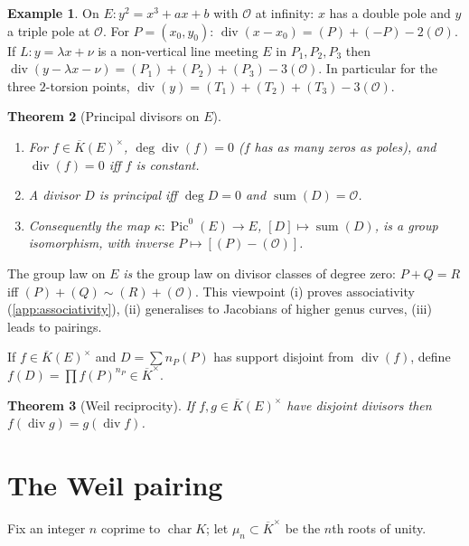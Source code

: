 \documentclass[11pt,a4paper,oneside]{book}
\theoremstyle{plain}
\newtheorem{theorem}{Theorem}[chapter]
\theoremstyle{definition}
\newtheorem{example}[theorem]{Example}
\theoremstyle{remark}
\newcommand{\Oinf}{\mathcal{O}}
\newcommand{\Kbar}{\overline{K}}
\newcommand{\Pic}{\operatorname{Pic}}
\newcommand{\divv}{\operatorname{div}}
\begin{document}
\begin{example}\label{ex:divisors}
On $E:y^2=x^3+ax+b$ with $\Oinf$ at infinity: $x$ has a double pole and $y$ a triple pole at $\Oinf$. For $P=(x_0,y_0)$: $\divv(x-x_0)=(P)+(-P)-2(\Oinf)$. If $L:y=\lambda x+\nu$ is a non-vertical line meeting $E$ in $P_1,P_2,P_3$ then $\divv(y-\lambda x-\nu)=(P_1)+(P_2)+(P_3)-3(\Oinf)$. In particular for the three $2$-torsion points, $\divv(y)=(T_1)+(T_2)+(T_3)-3(\Oinf)$.
\end{example}

\begin{theorem}[Principal divisors on $E$]\label{thm:principal}
\begin{enumerate}[nosep,label=(\roman*)]
\item For $f\in\Kbar(E)^\times$, $\deg\divv(f)=0$ ($f$ has as many zeros as poles), and $\divv(f)=0$ iff $f$ is constant.
\item A divisor $D$ is principal iff $\deg D=0$ and $\operatorname{sum}(D)=\Oinf$.
\item Consequently the map $\kappa:\Pic^0(E)\to E$, $[D]\mapsto\operatorname{sum}(D)$, is a group isomorphism, with inverse $P\mapsto[(P)-(\Oinf)]$.
\end{enumerate}
\end{theorem}

\begin{keyidea}
The group law on $E$ \emph{is} the group law on divisor classes of degree zero: $P+Q=R$ iff $(P)+(Q)\sim(R)+(\Oinf)$. This viewpoint (i) proves associativity (\cref{app:associativity}), (ii) generalises to Jacobians of higher genus curves, (iii) leads to pairings.
\end{keyidea}

If $f\in\Kbar(E)^\times$ and $D=\sum n_P(P)$ has support disjoint from $\divv(f)$, define $f(D)=\prod f(P)^{n_P}\in\Kbar^\times$.

\begin{theorem}[Weil reciprocity]\label{thm:weilrec}
If $f,g\in\Kbar(E)^\times$ have disjoint divisors then $f(\divv g)=g(\divv f)$.
\end{theorem}

\section{The Weil pairing}

Fix an integer $n$ coprime to $\operatorname{char}K$; let $\mu_n\subset\Kbar^\times$ be the $n$th roots of unity.
\end{document}
